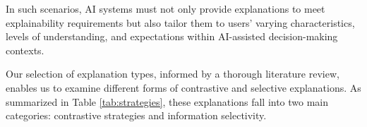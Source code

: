 

In such scenarios, AI systems must not only provide explanations to meet explainability requirements but also tailor them to users' varying characteristics, levels of understanding, and expectations within AI-assisted decision-making contexts.

Our selection of explanation types, informed by a thorough literature review, enables us to examine different forms of contrastive and selective explanations. As summarized in Table \ref{tab:strategies}, these explanations fall into two main categories: contrastive strategies and information selectivity.

